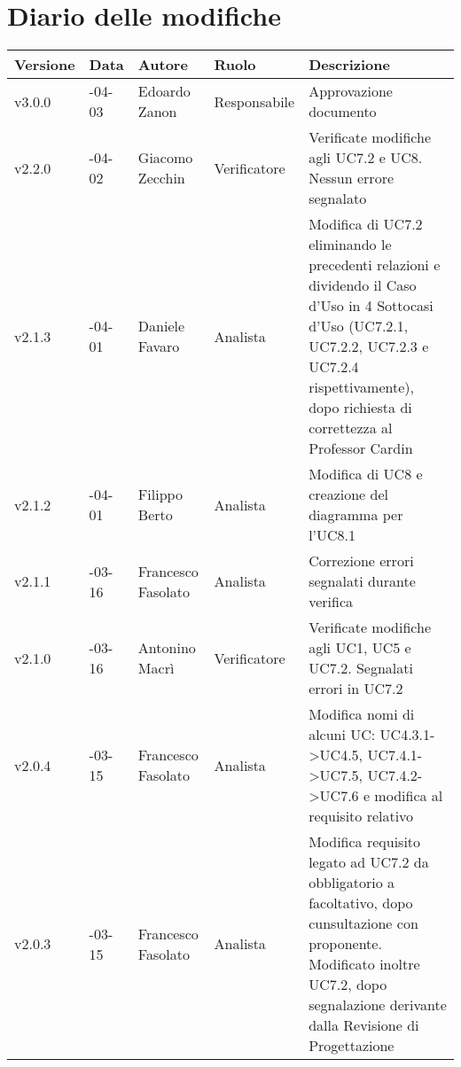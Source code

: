\vspace*{-10mm}
\section*{Diario delle modifiche}

	\begin{longtable} { >{\centering}p{1.4cm} >{\centering}p{2cm} >{\centering}p{2.3cm} >{\centering}p{2.7cm} p{5.5cm} }
	\toprule
	\textbf{Versione} & \textbf{Data} & \textbf{Autore} & \textbf{Ruolo} & \centerline{\textbf{Descrizione}} \\
	\midrule
	\arrayrulecolor{gray}

		v3.0.0 & 2017-04-03 & Edoardo Zanon & Responsabile & Approvazione documento\\
		\addlinespace[0.4em]
		\midrule
		\addlinespace[0.4em]
		v2.2.0 & 2017-04-02 & Giacomo Zecchin & Verificatore & Verificate modifiche agli UC7.2 e UC8. Nessun errore segnalato  \\
		\addlinespace[0.4em]
		\midrule
		\addlinespace[0.4em]
		v2.1.3 & 2017-04-01 & Daniele Favaro & Analista & Modifica di UC7.2 eliminando le precedenti relazioni e dividendo il Caso d'Uso in 4 Sottocasi d'Uso (UC7.2.1, UC7.2.2, UC7.2.3 e UC7.2.4 rispettivamente), dopo richiesta di correttezza al Professor Cardin\\
		\addlinespace[0.4em]
		\midrule
		\addlinespace[0.4em]
		v2.1.2 & 2017-04-01 & Filippo Berto & Analista & Modifica di UC8 e creazione del diagramma per l'UC8.1 \\
		\addlinespace[0.4em]
		\midrule
		\addlinespace[0.4em]
		v2.1.1 & 2017-03-16 & Francesco Fasolato & Analista & Correzione errori segnalati durante verifica \\
		\addlinespace[0.4em]
		\midrule
		\addlinespace[0.4em]	
		v2.1.0 & 2017-03-16 & Antonino Macrì & Verificatore & Verificate modifiche agli UC1, UC5 e UC7.2. Segnalati errori in UC7.2  \\
		\addlinespace[0.4em]
		\midrule
		\addlinespace[0.4em]
		v2.0.4 & 2017-03-15 & Francesco Fasolato & Analista & Modifica nomi di alcuni UC: UC4.3.1->UC4.5, UC7.4.1->UC7.5, UC7.4.2->UC7.6 e modifica al requisito relativo \\
		\addlinespace[0.4em]
		\midrule
		\addlinespace[0.4em]
		v2.0.3 & 2017-03-15 & Francesco Fasolato & Analista & Modifica requisito legato ad UC7.2 da obbligatorio a facoltativo, dopo cunsultazione con proponente. Modificato inoltre UC7.2, dopo segnalazione derivante dalla Revisione di Progettazione \\

\end{longtable}
